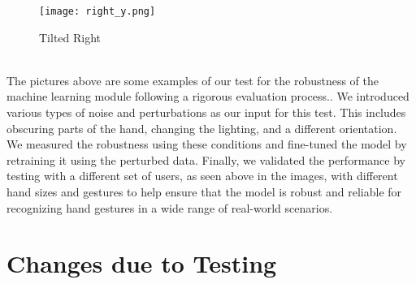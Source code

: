 \documentclass[12pt, titlepage]{article}
\begin{document}
\begin{figure}[!ht]
  \texttt{[image: right\_y.png]}
  \caption{Tilted Right}\label{fig:Tilted Right}
\endminipage\hfill
\end{figure}
~\\
The pictures above are some examples of our test for the robustness of the machine 
learning module following a rigorous evaluation process.. We introduced various types 
of noise and perturbations as our input for this test. This includes obscuring parts 
of the hand, changing the lighting, and a different orientation. We measured the robustness
using these conditions and fine-tuned the model by retraining it using the perturbed data. 
Finally, we validated the performance by testing with a different set of users, as seen above 
in the images, with different hand sizes and gestures to help ensure that the model is robust 
and reliable for recognizing hand gestures in a wide range of real-world scenarios.
\endminipage

\section{Changes due to Testing}
\end{document}
